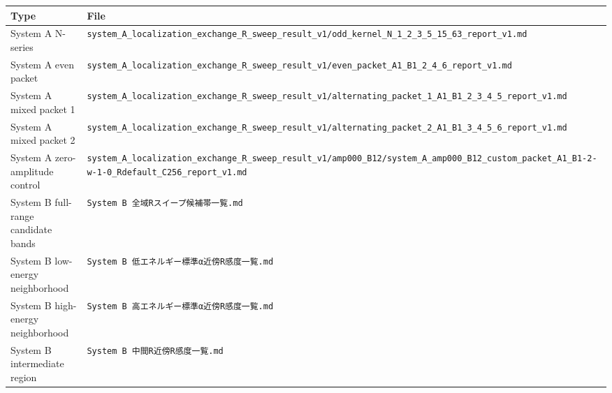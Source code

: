 \documentclass[
]{article}
\newcounter{none} %
\begin{document}
{\def\LTcaptype{none} %
\begin{longtable}[]{@{}
  >{\raggedright\arraybackslash}p{}
  >{\raggedright\arraybackslash}p{}@{}}
\toprule\noalign{}
\begin{minipage}[b]{\linewidth}\raggedright
Type
\end{minipage} & \begin{minipage}[b]{\linewidth}\raggedright
File
\end{minipage} \\
\midrule\noalign{}
\endhead
\bottomrule\noalign{}
\endlastfoot
System A N-series &
\texttt{system\_A\_localization\_exchange\_R\_sweep\_result\_v1/odd\_kernel\_N\_1\_2\_3\_5\_15\_63\_report\_v1.md} \\
System A even packet &
\texttt{system\_A\_localization\_exchange\_R\_sweep\_result\_v1/even\_packet\_A1\_B1\_2\_4\_6\_report\_v1.md} \\
System A mixed packet 1 &
\texttt{system\_A\_localization\_exchange\_R\_sweep\_result\_v1/alternating\_packet\_1\_A1\_B1\_2\_3\_4\_5\_report\_v1.md} \\
System A mixed packet 2 &
\texttt{system\_A\_localization\_exchange\_R\_sweep\_result\_v1/alternating\_packet\_2\_A1\_B1\_3\_4\_5\_6\_report\_v1.md} \\
System A zero-amplitude control &
\texttt{system\_A\_localization\_exchange\_R\_sweep\_result\_v1/amp000\_B12/system\_A\_amp000\_B12\_custom\_packet\_A1\_B1-2-w-1-0\_Rdefault\_C256\_report\_v1.md} \\
System B full-range candidate bands &
\texttt{System\ B\ 全域Rスイープ候補帯一覧.md} \\
System B low-energy neighborhood &
\texttt{System\ B\ 低エネルギー標準α近傍R感度一覧.md} \\
System B high-energy neighborhood &
\texttt{System\ B\ 高エネルギー標準α近傍R感度一覧.md} \\
System B intermediate region &
\texttt{System\ B\ 中間R近傍R感度一覧.md} \\
\end{longtable}
}
\end{document}
